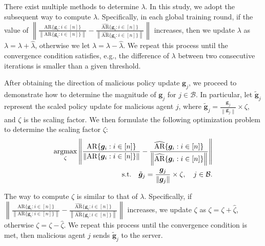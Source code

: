 There exist multiple methods to determine $\lambda$. In this study, we adopt the subsequent way to compute $\lambda$.
%
Specifically, in each global training round, if the value of  $\left\| \frac{{\text{AR}} \{ \bm{g}_i: i \in [n]\} }{\left\|{\text{AR}} \{\bm{g}_i: i \in [n]\} \right\|} - \frac{\widehat{\text{AR}} \{ \bm{g}_i: i \in [n]\} }{\left\| \widehat{\text{AR}} \{ \bm{g}_i: i \in [n]\}  \right\|} \right\|$  increases, then we update $\lambda$ as $\lambda = \lambda + \hat{\lambda}$, otherwise we let $\lambda = \lambda - \hat{\lambda}$.
We repeat this process until the convergence condition satisfies, e.g., the difference of $\lambda$ between two consecutive iterations is smaller than a given threshold. 


After obtaining the direction of malicious policy update $\bm{g}_j$, we proceed to demonstrate how to determine the magnitude of $\bm{g}_j$ for $j \in \mathcal{B}$.
In particular, let $\tilde{\bm{g}}_j$ represent the scaled policy update for malicious agent $j$, where $\tilde{\bm{g}}_j =  \frac{\bm{g}_j}{\left\| \bm{g}_j\right\|} \times \zeta$, and $\zeta$ is the scaling factor.
We then formulate the following optimization problem to determine the scaling factor $\zeta$:
%
%
\begin{equation}
\begin{split}
\label{optimization_stage_2}
\operatorname*{argmax}_{\zeta}  \left\| \frac{{\text{AR}} \{ \bm{g}_i: i \in [n]\} }{\left\|{\text{AR}} \{ \bm{g}_i: i \in [n]\} \right\|} - \frac{\widehat{\text{AR}} \{ \bm{g}_i: i \in [n]\} }{\left\| \widehat{\text{AR}} \{\bm{g}_i: i \in [n]\}  \right\|} \right\| \\
\text{s.t.} \quad 
\tilde{\bm{g}}_j =  \frac{\bm{g}_j}{\left\| \bm{g}_j\right\|} \times \zeta, \quad j \in \mathcal{B}.
\end{split}
\end{equation}



The way to compute $\zeta$  is similar to that of $\lambda$.
Specifically, if $\left\| \frac{{\text{AR}} \{ \bm{g}_i: i \in [n]\} }{\left\|{\text{AR}} \{ \bm{g}_i: i \in [n]\} \right\|} - \frac{\widehat{\text{AR}} \{ \bm{g}_i: i \in [n]\} }{\left\| \widehat{\text{AR}} \{ \bm{g}_i: i \in [n]\}  \right\|} \right\|$  increases, we update $\zeta$ as $\zeta = \zeta + \hat{\zeta}$, otherwise $\zeta = \zeta - \hat{\zeta}$. 
We repeat this process until the convergence condition is met, then malicious agent $j$ sends $\tilde{\bm{g}}_j$ to the server.




